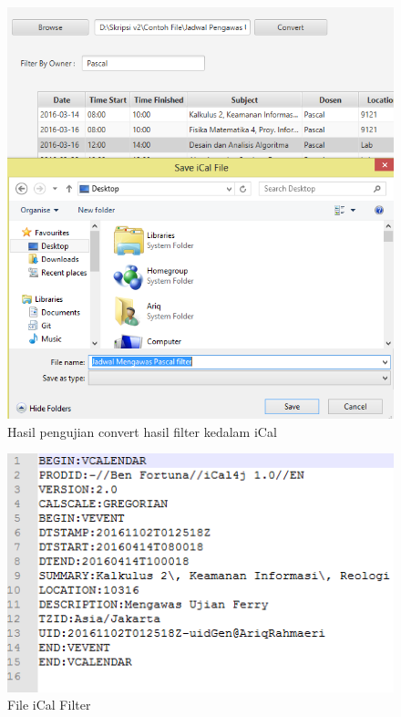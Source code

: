 \begin{enumerate}
\begin{figure}[H]
		\includegraphics[scale=0.5]{Gambar/filterKonvertiCal}
		\caption{Hasil pengujian convert hasil filter kedalam iCal}
		\label{fig:filterKonvertiCal}
		\end{figure}
		
		\begin{figure}[H]
		\centering
		\includegraphics[scale=0.5]{Gambar/fileiCalFilter}
		\caption{File iCal Filter}
		\label{fig:fileiCalFilter}
		\end{figure}
	

\end{enumerate}

